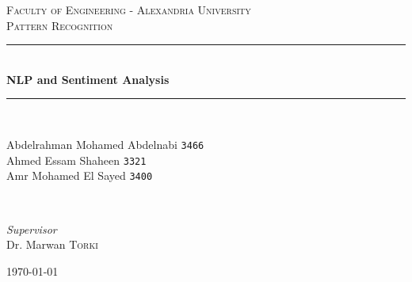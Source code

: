 \documentclass{article}
\begin{document}
\begin{titlepage} %
		\newcommand{\HRule}{\rule{\linewidth}{0.5mm}} %
		
		\center %
		
		
		\textsc{\LARGE Faculty of Engineering - Alexandria University}\\[1.5cm] %
		
		\textsc{\Large Pattern Recognition}\\[0.5cm] %
		

		\HRule\\[0.4cm]
		
		{\huge\bfseries NLP and Sentiment Analysis}\\[0.4cm] %
		
		\HRule\\[1.5cm]
		
		
		\begin{minipage}{0.5\textwidth}
			\begin{flushleft}
				\large
				Abdelrahman Mohamed Abdelnabi
				\texttt{3466} \\
				Ahmed Essam Shaheen
				\texttt{3321} \\
				Amr Mohamed El Sayed
				\texttt{3400} \\
			\end{flushleft}
		\end{minipage}
		~
		\begin{minipage}{0.3\textwidth}
			\begin{flushright}
				\large
				\textit{Supervisor}\\
				Dr. Marwan \textsc{Torki} %
			\end{flushright}
		\end{minipage}


		\vfill\vfill\vfill %
		
		{\large\today} %
		
		\vfill %
		
	\end{titlepage}
	
\end{document}
